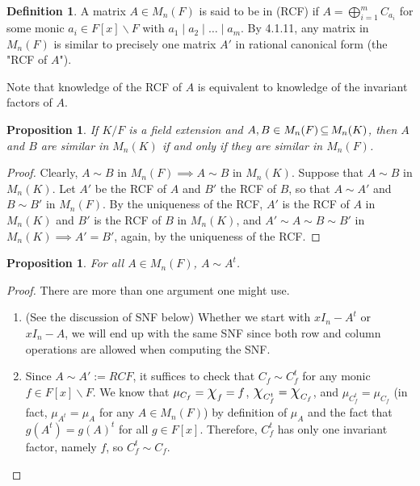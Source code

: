 \documentclass[11pt]{book}
\newcounter{counter}
\newtheorem{proposition}[counter]{Proposition}   \newtheorem{problem}[counter]{Problem}   \newtheorem*{proposition*}{Proposition}   \newtheorem*{lemma*}{Lemma}
\theoremstyle{definition}   \newtheorem{defn}[counter]{Definition} %
\newcommand{\bs}{\backslash}   \newcommand{\A}{\mathcal{A}}   \newcommand{\sy}{\textnormal{Syl}}   \newcommand{\size}[1]{\left| #1 \right|}
\newcommand{\Chi}{\mbox{\Large $\chi$}}
\newcommand{\vs}{\vspace{8pt}}
\numberwithin{counter}{chapter}
\begin{document}
\vs

\begin{defn}
A matrix $A \in M_n(F)$ is said to be in  (RCF) if $A = \bigoplus_{i=1}^m C_{a_i}$ for some monic $a_i \in F[x]\bs F$ with $a_1 \mid a_2 \mid \dots \mid a_m$. By 4.1.11, any matrix in $M_n(F)$ is similar to precisely one matrix $A'$ in rational canonical form  (the "RCF of $A$").
\end{defn}

Note that knowledge of the RCF of $A$ is equivalent to knowledge of the invariant factors of $A$.

\vs

\begin{proposition}
If $K/F$ is a field extension and $A,B \in M_n(F) \operatorname{\subseteq} M_n(K)$, then $A$ and $B$ are similar in $M_n(K)$ if and only if they are similar in $M_n(F)$.
\end{proposition}

\begin{proof}
Clearly, $A \sim B$ in $M_n(F) \implies A \sim B$ in $M_n(K)$. Suppose that $A \sim B$ in $M_n(K)$. Let $A'$ be the RCF of $A$ and $B'$ the RCF of $B$, so that $A \sim A'$ and $B \sim B'$ in $M_n(F)$. By the uniqueness of the RCF, $A'$ is the RCF of $A$ in $M_n(K)$ and $B'$ is the RCF of $B$ in $M_n(K)$, and $A' \sim A \sim B \sim B'$ in $M_n(K) \implies A' = B'$, again, by the uniqueness of the RCF.
\end{proof}

\vs

\begin{proposition}
For all $A \in M_n(F)$, $A \sim A^t$.
\end{proposition}

\begin{proof}
 There are more than one argument one might use.
 \begin{enumerate}
 \item[(1)] (See the discussion of SNF below) Whether we start with $xI_n - A^t$ or $xI_n - A$, we will end up with the same SNF since both row and column operations are allowed when computing the SNF.
 \item[(2)] Since $A \sim A' := RCF$, it suffices to check that $C_f \sim C_f^t$ for any monic $f \in F[x]\bs F$. We know that $\mu_{C_f} = \Chi_f = f$, $\Chi_{C_f^t} = \Chi_{C_f}$, and $\mu_{C_f^t} = \mu_{C_f}$ (in fact, $\mu_{A^t} = \mu_A$ for any $A \in M_n(F)$) by definition of $\mu_A$ and the fact that $g(A^t) = g(A)^t$ for all $g \in F[x]$. Therefore, $C_f^t$ has only one invariant factor, namely $f$, so $C_f^t \sim C_f$.
 \end{enumerate}
\end{proof}
\end{document}
